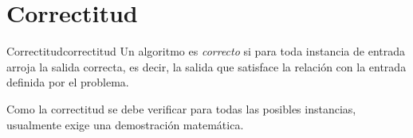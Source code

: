 \section{Correctitud}
\label{sec:correctitud}

\begin{definicion}{Correctitud}{correctitud}
  Un algoritmo es \emph{correcto} si para toda instancia de entrada arroja la salida correcta, es decir, la salida que satisface la relación con la entrada definida por el problema.
\end{definicion}

Como la correctitud se debe verificar para todas las posibles instancias, usualmente exige una demostración matemática.

